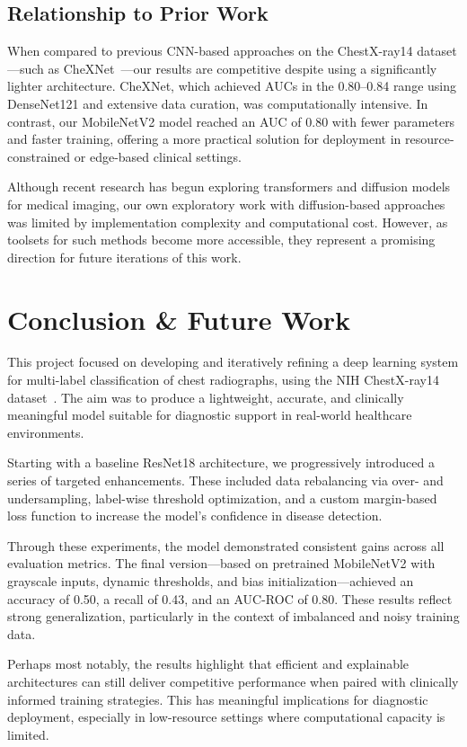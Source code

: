 \documentclass[12pt]{article}
\begin{document}
\begin{multicols}{2}
\subsection{Relationship to Prior Work}
When compared to previous CNN-based approaches on the ChestX-ray14 dataset—such as CheXNet~\cite{irvin2019chexpert}—our results are competitive despite using a significantly lighter architecture. CheXNet, which achieved AUCs in the 0.80–0.84 range using DenseNet121 and extensive data curation, was computationally intensive. In contrast, our MobileNetV2 model reached an AUC of 0.80 with fewer parameters and faster training, offering a more practical solution for deployment in resource-constrained or edge-based clinical settings.

Although recent research has begun exploring transformers and diffusion models for medical imaging, our own exploratory work with diffusion-based approaches was limited by implementation complexity and computational cost. However, as toolsets for such methods become more accessible, they represent a promising direction for future iterations of this work.


\section{Conclusion \& Future Work}

This project focused on developing and iteratively refining a deep learning system for multi-label classification of chest radiographs, using the NIH ChestX-ray14 dataset~\cite{wang2017chestx}. The aim was to produce a lightweight, accurate, and clinically meaningful model suitable for diagnostic support in real-world healthcare environments.

Starting with a baseline ResNet18 architecture, we progressively introduced a series of targeted enhancements. These included data rebalancing via over- and undersampling, label-wise threshold optimization, and a custom margin-based loss function to increase the model’s confidence in disease detection.

Through these experiments, the model demonstrated consistent gains across all evaluation metrics. The final version—based on pretrained MobileNetV2 with grayscale inputs, dynamic thresholds, and bias initialization—achieved an accuracy of 0.50, a recall of 0.43, and an AUC-ROC of 0.80. These results reflect strong generalization, particularly in the context of imbalanced and noisy training data.

Perhaps most notably, the results highlight that efficient and explainable architectures can still deliver competitive performance when paired with clinically informed training strategies. This has meaningful implications for diagnostic deployment, especially in low-resource settings where computational capacity is limited.


\end{multicols}
\end{document}
